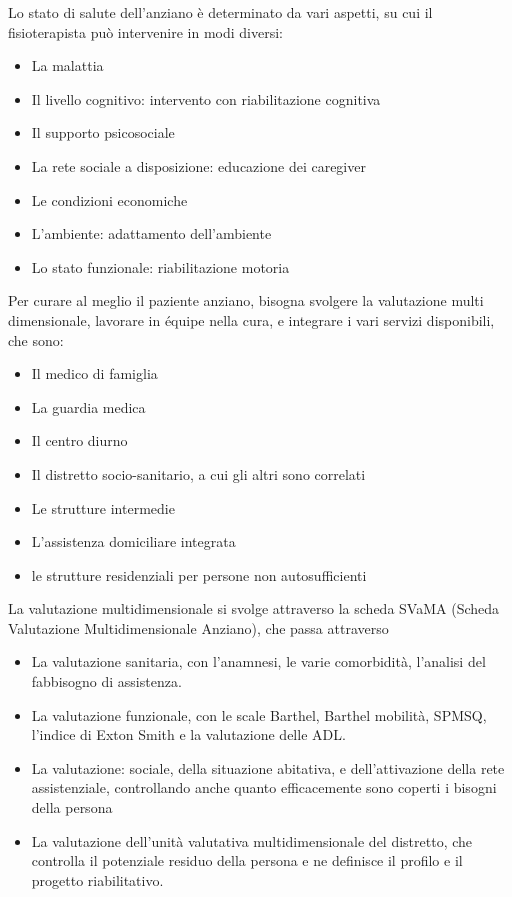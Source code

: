 Lo stato di salute dell'anziano è determinato da vari aspetti, su cui il
fisioterapista può intervenire in modi diversi:
\begin{itemize}
\item La malattia
\item Il livello cognitivo: intervento con riabilitazione cognitiva
\item Il supporto psicosociale
\item La rete sociale a disposizione: educazione dei caregiver
\item Le condizioni economiche
\item L'ambiente: adattamento dell'ambiente
\item Lo stato funzionale: riabilitazione motoria
\end{itemize}

Per curare al meglio il paziente anziano, bisogna svolgere la valutazione multi
dimensionale, lavorare in équipe nella cura, e integrare i vari servizi
disponibili, che sono:
\begin{itemize}
\item Il medico di famiglia
\item La guardia medica
\item Il centro diurno
\item Il distretto socio-sanitario, a cui gli altri sono correlati
\item Le strutture intermedie
\item L'assistenza domiciliare integrata
\item le strutture residenziali per persone non autosufficienti
\end{itemize}

La valutazione multidimensionale si svolge attraverso la scheda SVaMA (Scheda
Valutazione Multidimensionale Anziano), che passa attraverso
\begin{itemize}
\item La valutazione sanitaria, con l'anamnesi, le varie comorbidità, l'analisi
del fabbisogno di assistenza.
\item La valutazione funzionale, con le scale Barthel, Barthel mobilità, SPMSQ,
l'indice di Exton Smith e la valutazione delle ADL.
\item La valutazione: sociale, della situazione abitativa, e dell'attivazione
della rete assistenziale, controllando anche quanto efficacemente sono coperti
i bisogni della persona
\item La valutazione dell'unità valutativa multidimensionale del distretto, che
controlla il potenziale residuo della persona e ne definisce il profilo e il
progetto riabilitativo.
\end{itemize}

